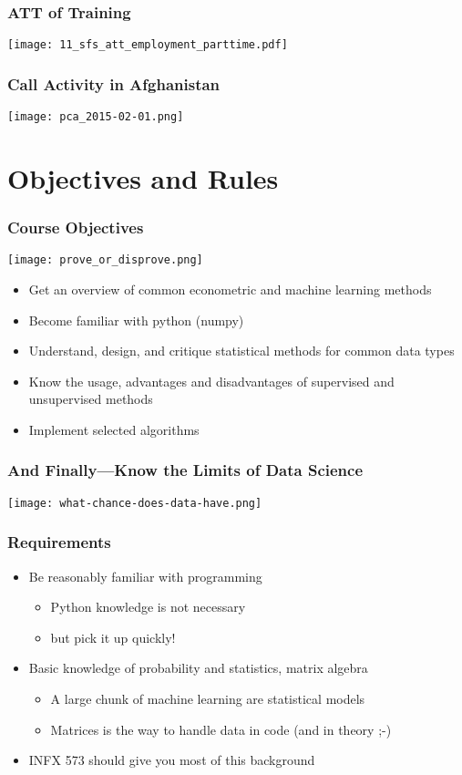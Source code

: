 \documentclass[mathserif, xcolor=table, svgnames]{beamer}
\begin{document}
\begin{frame}
  \frametitle{ATT of Training}
  \texttt{[image: 11\_sfs\_att\_employment\_parttime.pdf]}
\end{frame}

\begin{frame}
  \frametitle{Call Activity in Afghanistan}
  \texttt{[image: pca\_2015-02-01.png]}
\end{frame}

\section{Objectives and Rules}


\begin{frame}
  \frametitle{Course Objectives}
  \texttt{[image: prove\_or\_disprove.png]}
\end{frame}

\begin{frame}
  \begin{itemize}
  \item Get an overview of common econometric and machine learning
    methods 
  \item Become familiar with python (numpy)
  \item Understand, design, and critique statistical methods for
    common data types
  \item Know the usage, advantages and disadvantages of supervised and
    unsupervised methods
  \item Implement selected algorithms
  \end{itemize}
\end{frame}

\begin{frame}
  \frametitle{And Finally---Know the Limits of Data Science}
  \texttt{[image: what-chance-does-data-have.png]}
\end{frame}

\begin{frame}
  \frametitle{Requirements}
  \begin{itemize}
  \item Be reasonably familiar with programming
    \begin{itemize}
    \item Python knowledge is not necessary
    \item \alert{but pick it up quickly!}
    \end{itemize}
  \item Basic knowledge of probability and statistics, matrix algebra
    \begin{itemize}
    \item A large chunk of machine learning are statistical models
    \item Matrices is the way to handle data in code (and in theory ;-)
    \end{itemize}
  \item INFX 573 should give you most of this background
  \end{itemize}
\end{frame}
\end{document}
